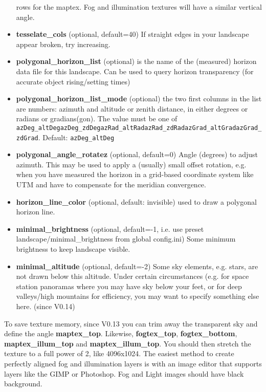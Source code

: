 \begin{itemize}
  rows for the maptex. Fog and illumination textures will have a similar
  vertical angle.
\item
  \textbf{tesselate\_cols} (optional, default=40) If straight edges in
  your landscape appear broken, try increasing.
\item
  \textbf{polygonal\_horizon\_list} (optional) is the name of the
  (measured) horizon data file for this landscape. Can be used to query
  horizon transparency (for accurate object rising/setting times)
\item
  \textbf{polygonal\_horizon\_list\_mode} (optional) the two first
  columns in the list are numbers: azimuth and altitude or zenith
  distance, in either degrees or radians or gradians(gon). The value
  must be one of
  \texttt{azDeg\_altDeg\textbar{}azDeg\_zdDeg\textbar{}azRad\_altRad\textbar{}azRad\_zdRad\textbar{}azGrad\_altGrad\textbar{}azGrad\_zdGrad}.
  Default: \texttt{azDeg\_altDeg}
\item
  \textbf{polygonal\_angle\_rotatez} (optional, default=0) Angle
  (degrees) to adjust azimuth. This may be used to apply a (usually)
  small offset rotation, e.g. when you have measured the horizon in a
  grid-based coordinate system like UTM and have to compensate for the
  meridian convergence.
\item
  \textbf{horizon\_line\_color} (optional, default: invisible) used to
  draw a polygonal horizon line.
\item
  \textbf{minimal\_brightness} (optional, default=-1, i.e. use preset
  landscape/minimal\_brightness from global config.ini) Some minimum
  brightness to keep landscape visible.
\item
  \textbf{minimal\_altitude} (optional, default=-2) Some sky elements,
  e.g. stars, are not drawn below this altitude. Under certain
  circumstances (e.g. for space station panoramas where you may have sky
  below your feet, or for deep valleys/high mountains for efficiency,
  you may want to specify something else here. (since V0.14)
\end{itemize}

To save texture memory, since V0.13 you can trim away the transparent
sky and define the angle \textbf{maptex\_top}. Likewise,
\textbf{fogtex\_top}, \textbf{fogtex\_bottom},
\textbf{maptex\_illum\_top} and \textbf{maptex\_illum\_top}. You should
then stretch the texture to a full power of 2, like 4096x1024. The
easiest method to create perfectly aligned fog and illumination layers
is with an image editor that supports layers like the GIMP or Photoshop.
Fog and Light images should have black background.

